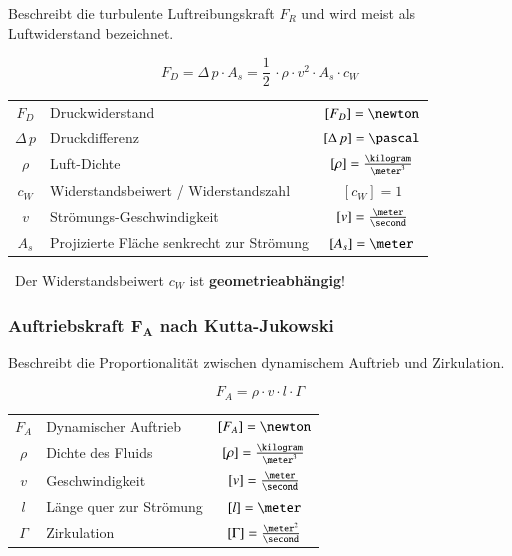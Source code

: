 Beschreibt die turbulente Luftreibungskraft $F_R$ und wird meist als Luftwiderstand bezeichnet.

$$ \boxed{ F_D = \Delta \, p \cdot A_s = \frac{1}{2} \, \cdot \rho \cdot v^2 \cdot A_s \cdot c_W } $$

\renewcommand{\arraystretch}{1.3}
\begin{tabular}{c l c}
	$F_D$           & Druckwiderstand                           & $[F_D] = \newton$                     \\
	$\Delta \, p$   & Druckdifferenz                            & $[\Delta \, p] = \pascal$             \\
	$\rho$          & Luft-Dichte                               & $[\rho] = \frac{\kilogram}{\meter^3}$ \\
	$c_W$           & Widerstandsbeiwert / Widerstandszahl      & $[c_W] = 1$                           \\
	$v$             & Strömungs-Geschwindigkeit                 & $[v] = \frac{\meter}{\second}$        \\
	$A_s$           & Projizierte Fläche senkrecht zur Strömung & $[A_s] = \meter$
\end{tabular}
\renewcommand{\arraystretch}{1}

\medskip

\textrightarrow\ Der Widerstandsbeiwert $c_W$ ist \textbf{geometrieabhängig}!


\subsubsection[Auftriebskraft nach Kutta-Jukowski]{Auftriebskraft $\bm{F_A}$ nach Kutta-Jukowski}

Beschreibt die Proportionalität zwischen dynamischem Auftrieb und Zirkulation.

$$ \boxed{ F_A = \rho \cdot v \cdot l \cdot \Gamma } $$

\renewcommand{\arraystretch}{1.3}
\begin{tabular}{c l c}
	$F_A$       & Dynamischer Auftrieb      & $[F_A] = \newton$                     \\
	$\rho$      & Dichte des Fluids         & $[\rho] = \frac{\kilogram}{\meter^3}$ \\
	$v$         & Geschwindigkeit           & $[v] = \frac{\meter}{\second}$        \\
	$l$         & Länge quer zur Strömung   & $[l] = \meter$                        \\
	$\Gamma$    & Zirkulation               & $[\Gamma] = \frac{\meter^2}{\second}$
\end{tabular}
\renewcommand{\arraystretch}{1}


